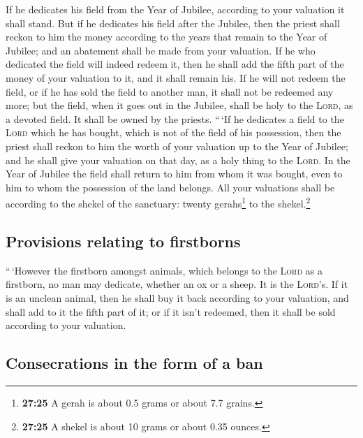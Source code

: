  If he dedicates his field from the Year of Jubilee,
according to your valuation it shall stand.  But if he
dedicates his field after the Jubilee, then the priest shall reckon to
him the money according to the years that remain to the Year of Jubilee;
and an abatement shall be made from your valuation.  If
he who dedicated the field will indeed redeem it, then he shall add the
fifth part of the money of your valuation to it, and it shall remain
his.  If he will not redeem the field, or if he has sold
the field to another man, it shall not be redeemed any more;
 but the field, when it goes out in the Jubilee, shall be
holy to the \textsc{Lord}, as a devoted field. It shall be owned by the
priests.  ``\,`If he dedicates a field to the
\textsc{Lord} which he has bought, which is not of the field of his
possession,  then the priest shall reckon to him the
worth of your valuation up to the Year of Jubilee; and he shall give
your valuation on that day, as a holy thing to the \textsc{Lord}.
 In the Year of Jubilee the field shall return to him
from whom it was bought, even to him to whom the possession of the land
belongs.  All your valuations shall be according to the
shekel of the sanctuary: twenty gerahs\footnote{\textbf{27:25} A gerah
  is about 0.5 grams or about 7.7 grains.} to the shekel.\footnote{\textbf{27:25}
  A shekel is about 10 grams or about 0.35 ounces.}

\hypertarget{provisions-relating-to-firstborns}{%
\subsection{Provisions relating to
firstborns}\label{provisions-relating-to-firstborns}}

 ``\,`However the firstborn amongst animals, which
belongs to the \textsc{Lord} as a firstborn, no man may dedicate,
whether an ox or a sheep. It is the \textsc{Lord}'s.  If
it is an unclean animal, then he shall buy it back according to your
valuation, and shall add to it the fifth part of it; or if it isn't
redeemed, then it shall be sold according to your valuation.

\hypertarget{consecrations-in-the-form-of-a-ban}{%
\subsection{Consecrations in the form of a
ban}\label{consecrations-in-the-form-of-a-ban}}

